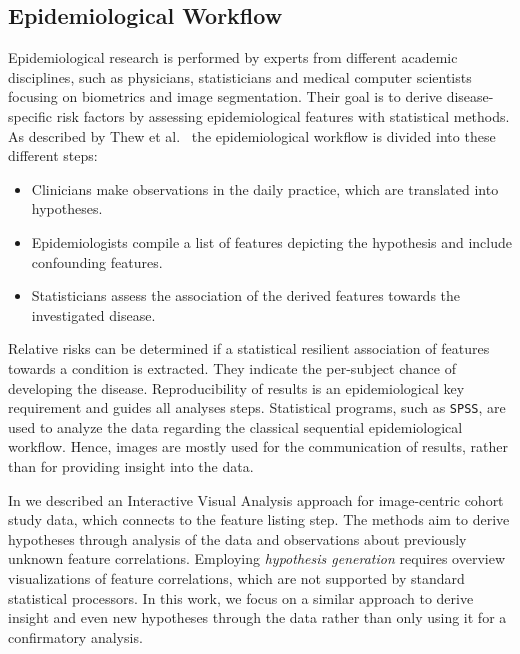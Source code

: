 \documentclass[journal]{style/vgtc} 			          %
\begin{document}
\subsection{Epidemiological Workflow} \label{EpidemiologicalWorkflow}
Epidemiological research is performed by experts from different academic disciplines, such as physicians, statisticians and medical computer scientists focusing on biometrics and image segmentation.
Their goal is to derive disease-specific risk factors by assessing epidemiological features with statistical methods.
As described by Thew et al.~\cite{Thew2009} the epidemiological workflow is divided into these different steps:
\begin{itemize}
	\item Clinicians make observations in the daily practice, which are translated into hypotheses.
	\item Epidemiologists compile a list of features depicting the hypothesis and include confounding features.
	\item Statisticians assess the association of the derived features towards the investigated disease.
\end{itemize}
Relative risks can be determined if a statistical resilient association of features towards a condition is extracted.
They indicate the per-subject chance of developing the disease.
Reproducibility of results is an epidemiological key requirement and guides all analyses steps.
Statistical programs, such as \texttt{SPSS}, are used to analyze the data regarding the classical sequential epidemiological workflow. Hence, images are mostly used for the communication of results, rather than for providing insight into the data.

In \cite{Klemm2014VIS} we described an Interactive Visual Analysis approach for image-centric cohort study data, which connects to the feature listing step.
The methods aim to derive hypotheses through analysis of the data and observations about previously unknown feature correlations.
Employing \emph{hypothesis generation} requires overview visualizations of feature correlations, which are not supported by standard statistical processors.
In this work, we focus on a similar approach to derive insight and even new hypotheses through the data rather than only using it for a confirmatory analysis.
\end{document}
